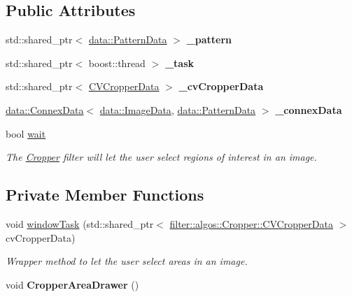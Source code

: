 \subsection*{Public Attributes}
\begin{DoxyCompactItemize}
\item 
\mbox{\label{classfilter_1_1algos_1_1_cropper_a73cbec21aefec48331f61324706e757d}} 
std\+::shared\+\_\+ptr$<$ \hyperlink{classfilter_1_1data_1_1_pattern_data}{data\+::\+Pattern\+Data} $>$ {\bfseries \+\_\+pattern}
\item 
\mbox{\label{classfilter_1_1algos_1_1_cropper_aa26d4d1e7a0f01e81f8bd3e55deffd8d}} 
std\+::shared\+\_\+ptr$<$ boost\+::thread $>$ {\bfseries \+\_\+task}
\item 
\mbox{\label{classfilter_1_1algos_1_1_cropper_a73991942b18729185075c88cb1bd9ad4}} 
std\+::shared\+\_\+ptr$<$ \hyperlink{classfilter_1_1algos_1_1_cropper_1_1_c_v_cropper_data}{C\+V\+Cropper\+Data} $>$ {\bfseries \+\_\+cv\+Cropper\+Data}
\item 
\mbox{\label{classfilter_1_1algos_1_1_cropper_a9e4dab0a308ad6fee25d6d471c8dc908}} 
\hyperlink{classfilter_1_1data_1_1_connex_data}{data\+::\+Connex\+Data}$<$ \hyperlink{classfilter_1_1data_1_1_image_data}{data\+::\+Image\+Data}, \hyperlink{classfilter_1_1data_1_1_pattern_data}{data\+::\+Pattern\+Data} $>$ {\bfseries \+\_\+connex\+Data}
\item 
bool \hyperlink{classfilter_1_1algos_1_1_cropper_ac7cf2a54e81d9227dc22b46d54603c7e}{wait}
\begin{DoxyCompactList}\small\item\em The \hyperlink{classfilter_1_1algos_1_1_cropper}{Cropper} filter will let the user select regions of interest in an image. \end{DoxyCompactList}\end{DoxyCompactItemize}
\subsection*{Private Member Functions}
\begin{DoxyCompactItemize}
\item 
void \hyperlink{classfilter_1_1algos_1_1_cropper_ad3cd43717d82f4d581bc2a1ed5f545e6}{window\+Task} (std\+::shared\+\_\+ptr$<$ \hyperlink{classfilter_1_1algos_1_1_cropper_1_1_c_v_cropper_data}{filter\+::algos\+::\+Cropper\+::\+C\+V\+Cropper\+Data} $>$ cv\+Cropper\+Data)
\begin{DoxyCompactList}\small\item\em Wrapper method to let the user select areas in an image. \end{DoxyCompactList}\item 
\mbox{\label{classfilter_1_1algos_1_1_cropper_a80cfdd159bee1bbfd071797e5d176193}} 
void {\bfseries Cropper\+Area\+Drawer} ()
\end{DoxyCompactItemize}
